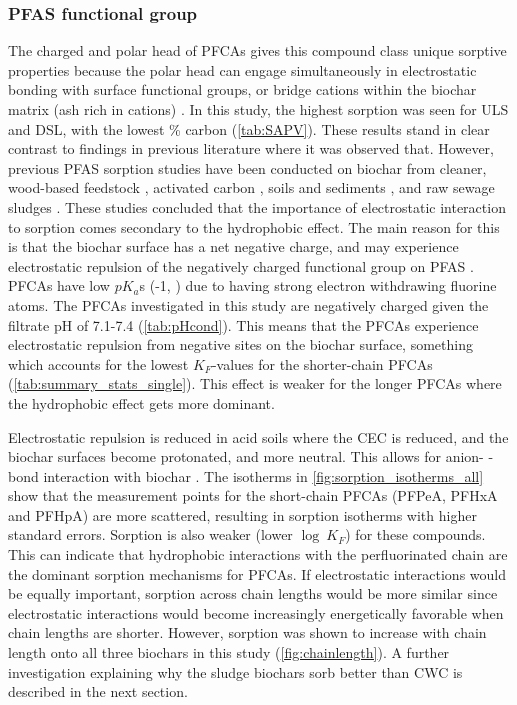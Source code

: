 \subsubsection{PFAS functional group} 
The charged and polar head of PFCAs gives this compound class unique sorptive properties because the polar head can engage simultaneously in electrostatic bonding with surface functional groups, or bridge cations within the biochar matrix (ash rich in cations) \citep{zhang2013sorption,sigmund2022sorption}. In this study, the highest sorption was seen for ULS and DSL, with the lowest \% carbon (\cref{tab:SAPV}). These results stand in clear contrast to findings in previous literature where it was observed that. However, previous PFAS sorption studies have been conducted on biochar from cleaner, wood-based feedstock \citep{Sormo2021}, activated carbon \citep{zhang2021sorption,Kupryianchyk2016b}, soils and sediments \citep{higgins2006sorption}, and raw sewage sludges \citep{zhang2013sorption}. These studies concluded that the importance of electrostatic interaction to sorption comes secondary to the hydrophobic effect. The main reason for this is that the biochar surface has a net negative charge, and may experience electrostatic repulsion of the negatively charged functional group on PFAS \citep{Ahmad2014}. PFCAs have low $pK_a$s (-1, \citep{goss2008pKa}) due to having strong electron withdrawing fluorine atoms. The PFCAs investigated in this study are negatively charged given the filtrate pH of 7.1-7.4 (\cref{tab:pHcond}). This means that the PFCAs experience electrostatic repulsion from negative sites on the biochar surface, something which accounts for the lowest $K_F$-values for the shorter-chain PFCAs (\cref{tab:summary_stats_single}). This effect is weaker for the longer PFCAs where the hydrophobic effect gets more dominant. 

Electrostatic repulsion is reduced in acid soils where the CEC is reduced, and the biochar surfaces become protonated, and more neutral. This allows for anion- \textpi-bond interaction with biochar \citep{sigmund2022sorption}. The isotherms in \cref{fig:sorption_isotherms_all} show that the measurement points for the short-chain PFCAs (PFPeA, PFHxA and PFHpA) are more scattered, resulting in sorption isotherms with higher standard errors. Sorption is also weaker (lower $\log~K_F$) for these compounds. This can indicate that hydrophobic interactions with the perfluorinated chain are the dominant sorption mechanisms for PFCAs. If electrostatic interactions would be equally important, sorption across chain lengths would be more similar since electrostatic interactions would become increasingly energetically favorable when chain lengths are shorter. However, sorption was shown to increase with chain length onto all three biochars in this study (\cref{fig:chainlength}). A further investigation explaining why the sludge biochars sorb better than CWC is described in the next section.

